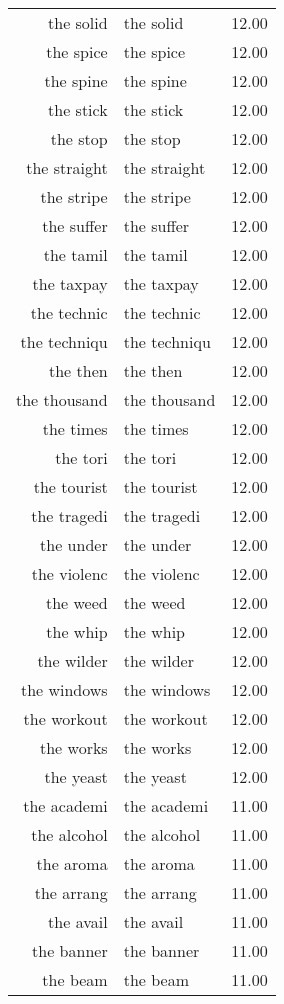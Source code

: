 \begin{table}[ht]
\begin{tabular}{rlr}
  the solid & the solid & 12.00 \\ 
  the spice & the spice & 12.00 \\ 
  the spine & the spine & 12.00 \\ 
  the stick & the stick & 12.00 \\ 
  the stop & the stop & 12.00 \\ 
  the straight & the straight & 12.00 \\ 
  the stripe & the stripe & 12.00 \\ 
  the suffer & the suffer & 12.00 \\ 
  the tamil & the tamil & 12.00 \\ 
  the taxpay & the taxpay & 12.00 \\ 
  the technic & the technic & 12.00 \\ 
  the techniqu & the techniqu & 12.00 \\ 
  the then & the then & 12.00 \\ 
  the thousand & the thousand & 12.00 \\ 
  the times & the times & 12.00 \\ 
  the tori & the tori & 12.00 \\ 
  the tourist & the tourist & 12.00 \\ 
  the tragedi & the tragedi & 12.00 \\ 
  the under & the under & 12.00 \\ 
  the violenc & the violenc & 12.00 \\ 
  the weed & the weed & 12.00 \\ 
  the whip & the whip & 12.00 \\ 
  the wilder & the wilder & 12.00 \\ 
  the windows & the windows & 12.00 \\ 
  the workout & the workout & 12.00 \\ 
  the works & the works & 12.00 \\ 
  the yeast & the yeast & 12.00 \\ 
  the academi & the academi & 11.00 \\ 
  the alcohol & the alcohol & 11.00 \\ 
  the aroma & the aroma & 11.00 \\ 
  the arrang & the arrang & 11.00 \\ 
  the avail & the avail & 11.00 \\ 
  the banner & the banner & 11.00 \\ 
  the beam & the beam & 11.00 \\ 

\end{tabular}
\end{table}

